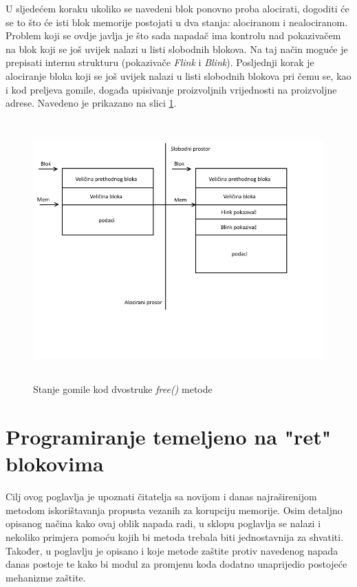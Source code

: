 \documentclass[times, utf8, diplomski, numeric]{fer}
\begin{document}
U sljedećem koraku ukoliko se navedeni blok ponovno proba
alocirati, dogoditi će se to što će isti blok memorije postojati
u dva stanja: alociranom i nealociranom. Problem koji se ovdje
javlja je što sada napadač ima kontrolu nad pokazivačem na blok
koji se još uvijek nalazi u listi slobodnih blokova. Na taj način
moguće je prepisati internu strukturu (pokazivače \emph{Flink} i
\emph{Blink}). Posljednji korak je alociranje bloka koji se još
uvijek nalazi u listi slobodnih blokova pri čemu se, kao i kod
preljeva gomile, događa upisivanje proizvoljnih vrijednosti na
proizvoljne adrese. Navedeno je prikazano na slici 
\ref{fig:double_free}.

\begin{figure}[!ht]
\centering
\setlength\fboxsep{0pt}
\setlength\fboxrule{0.5pt}
\includegraphics[width=15cm, height=10cm]{slike/double_free}
\caption{Stanje gomile kod dvostruke \emph{free()} metode}
\label{fig:double_free} 
\end{figure}

 
\section{Programiranje temeljeno na "ret" blokovima}
\label{sct:rop}

Cilj ovog poglavlja je upoznati čitatelja sa novijom i danas
najraširenijom metodom iskorištavanja propusta vezanih za
korupciju memorije. Osim detaljno opisanog načina kako ovaj oblik
napada radi, u sklopu poglavlja se nalazi i nekoliko primjera
pomoću kojih bi metoda trebala biti jednostavnija za shvatiti.
Također, u poglavlju je opisano i koje metode zaštite protiv
navedenog napada danas postoje te kako bi modul za promjenu koda
dodatno unaprijedio postojeće mehanizme zaštite.
\end{document}
